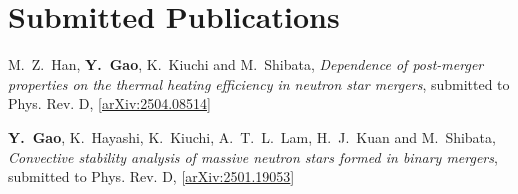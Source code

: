 \newcommand{\arxiv}[1]{[\href{http://arxiv.org/abs/#1}{arXiv:#1}]}
\newcommand{\citeCount}[1]{(#1 citations)}
\renewcommand{\citeCount}[1]{}


\setcounter{numPubs}{26}
\setcounter{pubCounter}{\value{numPubs}}

\section{\sc Submitted Publications}
\begin{etaremune}[start=\value{pubCounter}]
  \item
  M.~Z.~Han, {\bf Y.~Gao}, K.~Kiuchi and M.~Shibata,
  {\it Dependence of post-merger properties on the thermal heating efficiency in neutron star mergers},
  submitted to Phys. Rev. D,
  \arxiv{2504.08514}
  \item
  {\bf Y.~Gao}, K.~Hayashi, K.~Kiuchi, A.~T.~L.~Lam, H.~J.~Kuan and M.~Shibata,
  {\it Convective stability analysis of massive neutron stars formed in binary mergers},
  submitted to Phys. Rev. D,
  \arxiv{2501.19053}
\end{etaremune}



